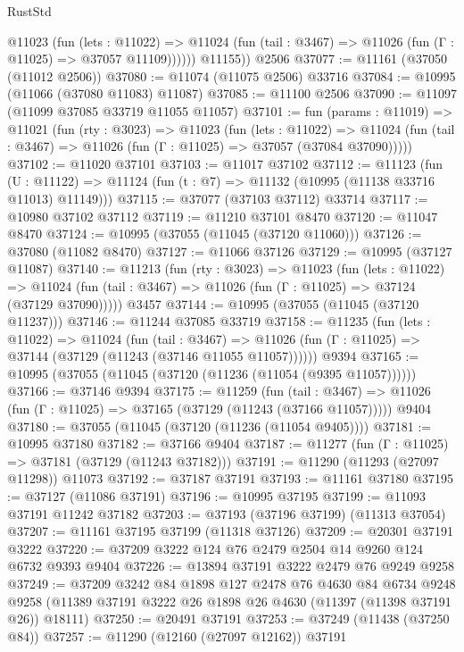 \begin{lexlean}{RustStd}
\begin{coremodule}
            @11023
              (fun (lets : @11022) =>
              @11024 (fun (tail : @3467) => @11026 (fun (Γ : @11025) => @37057 @11109))))))
        @11155))
    @2506
@37077 := @11161 (@37050 (@11012 @2506))
@37080 := @11074 (@11075 @2506) @33716
@37084 := @10995 (@11066 (@37080 @11083) @11087)
@37085 := @11100 @2506
@37090 := @11097 (@11099 @37085 @33719 @11055 @11057)
@37101 := fun (params : @11019) =>
  @11021
    (fun (rty : @3023) =>
    @11023
      (fun (lets : @11022) =>
      @11024 (fun (tail : @3467) => @11026 (fun (Γ : @11025) => @37057 (@37084 @37090)))))
@37102 := @11020 @37101
@37103 := @11017 @37102
@37112 := @11123
    (fun (U : @11122) => @11124 (fun (t : @7) => @11132 (@10995 (@11138 @33716 @11013) @11149)))
@37115 := @37077 (@37103 @37112) @33714
@37117 := @10980 @37102 @37112
@37119 := @11210 @37101 @8470
@37120 := @11047 @8470
@37124 := @10995 (@37055 (@11045 (@37120 @11060)))
@37126 := @37080 (@11082 @8470)
@37127 := @11066 @37126
@37129 := @10995 (@37127 @11087)
@37140 := @11213
    (fun (rty : @3023) =>
    @11023
      (fun (lets : @11022) =>
      @11024 (fun (tail : @3467) => @11026 (fun (Γ : @11025) => @37124 (@37129 @37090)))))
    @3457
@37144 := @10995 (@37055 (@11045 (@37120 @11237)))
@37146 := @11244 @37085 @33719
@37158 := @11235
    (fun (lets : @11022) =>
    @11024
      (fun (tail : @3467) =>
      @11026 (fun (Γ : @11025) => @37144 (@37129 (@11243 (@37146 @11055 @11057))))))
    @9394
@37165 := @10995 (@37055 (@11045 (@37120 (@11236 (@11054 (@9395 @11057))))))
@37166 := @37146 @9394
@37175 := @11259
    (fun (tail : @3467) => @11026 (fun (Γ : @11025) => @37165 (@37129 (@11243 (@37166 @11057)))))
    @9404
@37180 := @37055 (@11045 (@37120 (@11236 (@11054 @9405))))
@37181 := @10995 @37180
@37182 := @37166 @9404
@37187 := @11277 (fun (Γ : @11025) => @37181 (@37129 (@11243 @37182)))
@37191 := @11290 (@11293 (@27097 @11298)) @11073
@37192 := @37187 @37191
@37193 := @11161 @37180
@37195 := @37127 (@11086 @37191)
@37196 := @10995 @37195
@37199 := @11093 @37191 @11242 @37182
@37203 := @37193 (@37196 @37199) (@11313 @37054)
@37207 := @11161 @37195 @37199 (@11318 @37126)
@37209 := @20301 @37191 @3222
@37220 := @37209 @3222 @124 @76 @2479 @2504 @14 @9260 @124 @6732 @9393 @9404
@37226 := @13894 @37191 @3222 @2479 @76 @9249 @9258
@37249 := @37209
    @3242
    @84
    @1898
    @127
    @2478
    @76
    @4630
    @84
    @6734
    @9248
    @9258
    (@11389 @37191 @3222 @26 @1898 @26 @4630 (@11397 (@11398 @37191 @26)) @18111)
@37250 := @20491 @37191
@37253 := @37249 (@11438 (@37250 @84))
@37257 := @11290 (@12160 (@27097 @12162)) @37191

\end{coremodule}
\end{lexlean}
